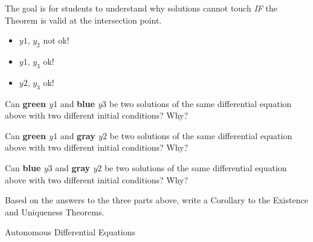 \begin{annotation}
\begin{goals}
	The goal is for students to understand why solutions cannot touch \emph{IF} the Theorem is valid at the intersection point.
	
	\begin{itemize}
		\item  $y1$, $y_2$ not ok!
		\item  $y1$, $y_3$ ok!
		\item  $y2$, $y_3$ ok!
	\end{itemize}
\end{goals}	
\end{annotation}
\begin{parts}
	\item Can \textbf{\color{green} green $y1$} and \textbf{\color{cyan} blue $y3$} be two solutions of the same differential equation above with two different initial conditions? Why?
	\item Can \textbf{\color{green} green $y1$} and \textbf{\color{gray} gray $y2$} be two solutions of the same differential equation above with two different initial conditions? Why?
	\item Can \textbf{\color{cyan} blue $y3$} and \textbf{\color{gray} gray $y2$} be two solutions of the same differential equation above with two different initial conditions? Why?

	\item Based on the answers to the three parts above, write a Corollary to the Existence and Uniqueness Theorems.
\end{parts}












\standardonlynewpage





\begin{module}{Autonomous Differential Equations}

	\label{ODE:autonomous}

	
	






\end{module}



